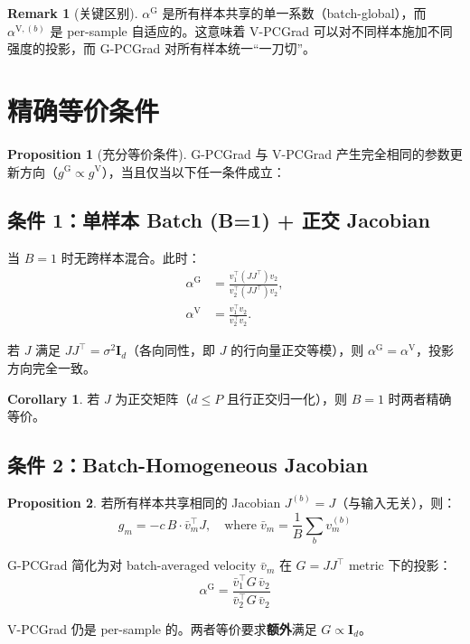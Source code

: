 \documentclass[11pt,a4paper]{article}
\theoremstyle{definition}
\newtheorem{remark}{Remark}
\newtheorem{proposition}{Proposition}
\newtheorem{corollary}{Corollary}
\begin{document}
\begin{remark}[关键区别]
$\alpha^{\mathrm{G}}$ 是所有样本共享的单一系数（batch-global），而 $\alpha^{\mathrm{V},(b)}$ 是 per-sample 自适应的。这意味着 V-PCGrad 可以对不同样本施加不同强度的投影，而 G-PCGrad 对所有样本统一``一刀切''。
\end{remark}

\section{精确等价条件}
\label{sec:equivalence}

\begin{proposition}[充分等价条件]
\label{prop:equivalence}
G-PCGrad 与 V-PCGrad 产生完全相同的参数更新方向（$g^{\mathrm{G}} \propto g^{\mathrm{V}}$），当且仅当以下任一条件成立：
\end{proposition}

\subsection{条件 1：单样本 Batch (B=1) + 正交 Jacobian}

当 $B=1$ 时无跨样本混合。此时：
\begin{align}
\alpha^{\mathrm{G}} &= \frac{v_1^\top (JJ^\top) v_2}{v_2^\top (JJ^\top) v_2}, \\
\alpha^{\mathrm{V}} &= \frac{v_1^\top v_2}{v_2^\top v_2}.
\end{align}

若 $J$ 满足 $JJ^\top = \sigma^2 \bm{I}_d$（各向同性，即 $J$ 的行向量正交等模），则 $\alpha^{\mathrm{G}} = \alpha^{\mathrm{V}}$，投影方向完全一致。

\begin{corollary}
若 $J$ 为正交矩阵（$d \leq P$ 且行正交归一化），则 $B=1$ 时两者精确等价。
\end{corollary}

\subsection{条件 2：Batch-Homogeneous Jacobian}

\begin{proposition}
若所有样本共享相同的 Jacobian $J^{(b)} = J$（与输入无关），则：
\begin{equation}
g_m = -c\,B\cdot\bar{v}_m^\top J, \quad \text{where}\;\bar{v}_m = \frac{1}{B}\sum_b v_m^{(b)}
\end{equation}

G-PCGrad 简化为对 batch-averaged velocity $\bar{v}_m$ 在 $G = JJ^\top$ metric 下的投影：
\begin{equation}
\alpha^{\mathrm{G}} = \frac{\bar{v}_1^\top G\,\bar{v}_2}{\bar{v}_2^\top G\,\bar{v}_2}
\end{equation}

V-PCGrad 仍是 per-sample 的。两者等价要求\textbf{额外}满足 $G \propto \bm{I}_d$。
\end{proposition}
\end{document}
